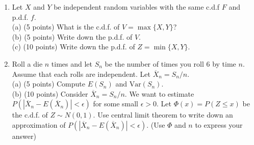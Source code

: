 \documentclass[14pt]{extarticle}
\begin{document}
\begin{enumerate}
    \item Let $X$ and $Y$ be independent random variables with the same c.d.f $F$ and p.d.f. $f$.\\
    (a) (5 points) What is the c.d.f. of $V=\max\{X,Y\}$?\\
    (b) (5 points) Write down the p.d.f. of $V$.\\
    (c) (10 points) Write down the p.d.f. of $Z=\min\{X,Y\}$.
    
    \item Roll a die $n$ times and let $S_n$ be the number of times you roll $6$ by time $n$. Assume that each rolls are independent. Let $\overline{X}_n=S_n/n$.\\
    (a) (5 points) Compute $E(S_n)$ and $\text{Var}(S_n)$.\\
    (b) (10 points) Consider $\overline{X}_n=S_n/n$. We want to estimate $P(|\overline{X}_n-E(\overline{X}_n)|<\epsilon)$ for some small $\epsilon>0$. Let $\Phi(x)=P(Z\leq x)$ be the c.d.f. of $Z\sim N(0,1)$. Use central limit theorem to write down an approximation of $P(|\overline{X}_n-E(\overline{X}_n)|<\epsilon)$. (Use $\Phi$ and $n$ to express your answer)


\end{enumerate}
\end{document}
